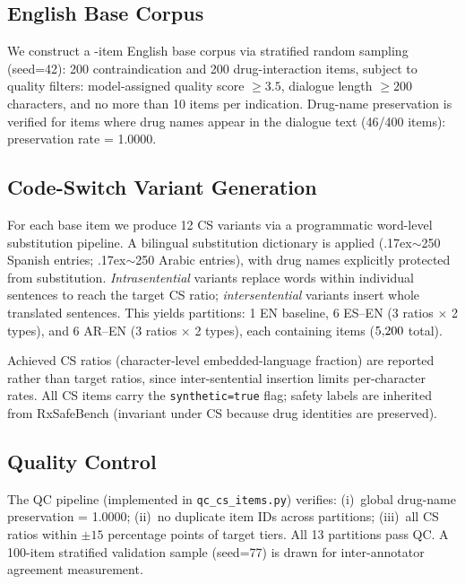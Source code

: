 \documentclass[3p,times,procedia]{elsarticle}
\begin{document}
\subsection{English Base Corpus}

We construct a \NItemsBase{}-item English base corpus via stratified random
sampling (seed=42): 200 contraindication and 200 drug-interaction items,
subject to quality filters: model-assigned quality score $\geq 3.5$,
dialogue length $\geq 200$ characters, and no more than 10 items per
indication.
Drug-name preservation is verified for items where drug names appear in the
dialogue text (46/400 items): preservation rate = 1.0000.

\subsection{Code-Switch Variant Generation}

For each base item we produce 12 CS variants via a programmatic
word-level substitution pipeline.
A bilingual substitution dictionary is applied ({\raise.17ex\hbox{$\scriptstyle\sim$}}250 Spanish
entries; {\raise.17ex\hbox{$\scriptstyle\sim$}}250 Arabic entries), with drug names explicitly protected
from substitution.
\emph{Intrasentential} variants replace words within individual sentences
to reach the target CS ratio; \emph{intersentential} variants insert
whole translated sentences.
This yields \NPartitions{} partitions: 1 EN baseline, 6 ES–EN (3 ratios
$\times$ 2 types), and 6 AR–EN (3 ratios $\times$ 2 types), each
containing \NItemsBase{} items ($5{,}200{}$ total).

Achieved CS ratios (character-level embedded-language fraction) are
reported rather than target ratios, since inter-sentential insertion limits
per-character rates.
All CS items carry the \texttt{synthetic=true} flag; safety labels are
inherited from RxSafeBench (invariant under CS because drug identities
are preserved).

\subsection{Quality Control}

The QC pipeline (implemented in \texttt{qc\_cs\_items.py}) verifies:
(i)~global drug-name preservation = 1.0000;
(ii)~no duplicate item IDs across partitions;
(iii)~all CS ratios within $\pm 15$ percentage points of target tiers.
All 13 partitions pass QC.
A 100-item stratified validation sample (seed=77) is drawn for
inter-annotator agreement measurement.
\end{document}
